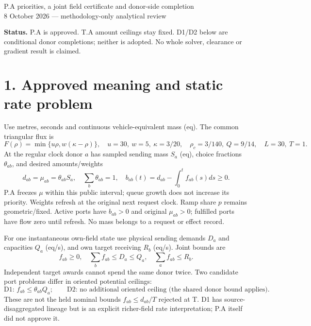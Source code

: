 \documentclass[11pt,a4paper]{article}
\begin{document}
\begin{center}{\Large P.A priorities, a joint field certificate and donor-side completion}\\[4pt]
8 October 2026 --- methodology-only analytical review\end{center}
\textbf{Status.} P.A is approved. T.A amount ceilings stay fixed. D1/D2 below
are conditional donor completions; neither is adopted. No whole solver,
clearance or gradient result is claimed.

\section*{1. Approved meaning and static rate problem}
Use metres, seconds and continuous vehicle-equivalent mass (eq). The common
triangular flux is
\begin{equation}
 F(\rho)=\min\{u\rho,w(\kappa-\rho)\},\quad u=30,\ w=5,\ \kappa=3/20,
 \quad\rho_c=3/140,\ Q=9/14,\quad L=30,\ T=1.
\end{equation}
At the regular clock donor $a$ has sampled sending mass $S_a$ (eq), choice
fractions $\theta_{ab}$, and desired amounts/weights
\begin{equation}
 d_{ab}=\mu_{ab}=\theta_{ab}S_a,\quad \sum_b\theta_{ab}=1,\quad
 b_{ab}(t)=d_{ab}-\int_0^t f_{ab}(s)ds\ge0.
\end{equation}
P.A freezes $\mu$ within this public interval; queue growth does not increase
its priority. Weights refresh at the original next request clock. Ramp share
$p$ remains geometric/fixed. Active ports have $b_{ab}>0$ and original
$\mu_{ab}>0$; fulfilled ports have flow zero until refresh. No mass belongs
to a request or effect record.

For one instantaneous own-field state use physical sending demands $D_a$ and
capacities $Q_a$ (eq/s), and own target receiving $R_b$ (eq/s). Joint bounds are
\begin{equation}
 f_{ab}\ge0,\quad\sum_b f_{ab}\le D_a\le Q_a,\quad
 \sum_a f_{ab}\le R_b.
\end{equation}
Independent target awards cannot spend the same donor twice. Two candidate
port problems differ in oriented potential ceilings:
\begin{equation}
 \text{D1: } f_{ab}\le\theta_{ab}Q_a;\qquad
 \text{D2: no additional oriented ceiling (the shared donor bound applies).}
\end{equation}
These are not the held nominal bounds $f_{ab}\le d_{ab}/T$ rejected at T.
D1 has source-disaggregated lineage but is an explicit richer-field rate
interpretation; P.A itself did not approve it.
\end{document}
